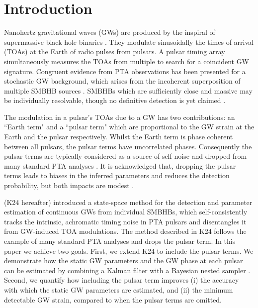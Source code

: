 \documentclass[fleqn,usenatbib,useAMS]{mnras}
\begin{document}
\section{Introduction}\label{sec:intro}
Nanohertz gravitational waves (GWs) are produced by the inspiral of supermassive black hole binaries \citep[SMBHBs;][]{Rajagopal1995,Jaffe_2003, Wyithe2003,Sesana2013,McWilliams_2014,Ravi2015MNRAS.447.2772R,Burke2019, Skyes2022}. They modulate sinusoidally the times of arrival (TOAs) at the Earth of radio pulses from pulsars. A pulsar timing array \citep[PTA;][]{ Tiburzi2018, 2021hgwa.bookE...4V} simultaneously measures the TOAs from multiple to search for a coincident GW signature. Congruent evidence from PTA observations has been presented \citep{2023ApJ...951L...8A,2023arXiv230616214A,2023ApJ...951L...6R,2023RAA....23g5024X} for a stochastic GW background, which arises from the incoherent superposition of multiple SMBHB sources \citep{Allen1997,Sesana10,Christensen2019,Renzini2022}. SMBHBs which are sufficiently close and massive may be individually resolvable, though no definitive detection is yet claimed \citep{Jenet2004,Zhu2014PPTA,Babak2016,Arzoumanian2023,2023arXiv230616226A}. \newline 

The modulation in a pulsar's TOAs due to a GW has two contributions: an ``Earth term" and a ``pulsar term" which are proportional to the GW strain at the Earth and the pulsar respectively. Whilst the Earth term is phase coherent between all pulsars, the pulsar terms have uncorrelated phases. Consequently the pulsar terms are typically considered as a source of self-noise and dropped from many standard PTA analyses \citep[e.g.][]{Sesana2010,Babak2012,Petiteau2013,Zhu2015,Taylors2016,Goldstein2018,Charisi2023arXiv230403786C}. It is acknowledged that, dropping the pulsar terms leads to biases in the inferred parameters and reduces the detection probability, but both impacts are modest \citep{Zhupulsarterms,Chen2022,KimpsonPTA}. \newline 

\cite{KimpsonPTA} (K24 hereafter) introduced a state-space method for the detection and parameter estimation of continuous GWs from individual SMBHBs, which self-consistently tracks the intrinsic, achromatic timing noise in PTA pulsars \citep[e.g.][]{Shannon2010,Lasky2015,Caballero2016,Goncharov2021} and disentangles it from GW-induced TOA modulations. The method described in K24 follows the example of many standard PTA analyses and drops the pulsar term. In this paper we achieve two goals. First, we extend K24 to include the pulsar terms. We demonstrate how the static GW parameters and the GW phase at each pulsar can be estimated by combining a Kalman filter \citep{Kalman1} with a Bayesian nested sampler \citep{Skilling, Ashton2022}. Second, we quantify how including the pulsar term improves (i) the accuracy with which the static GW parameters are estimated, and (ii) the minimum detectable GW strain, compared to when the pulsar terms are omitted.  \newline 
\end{document}
